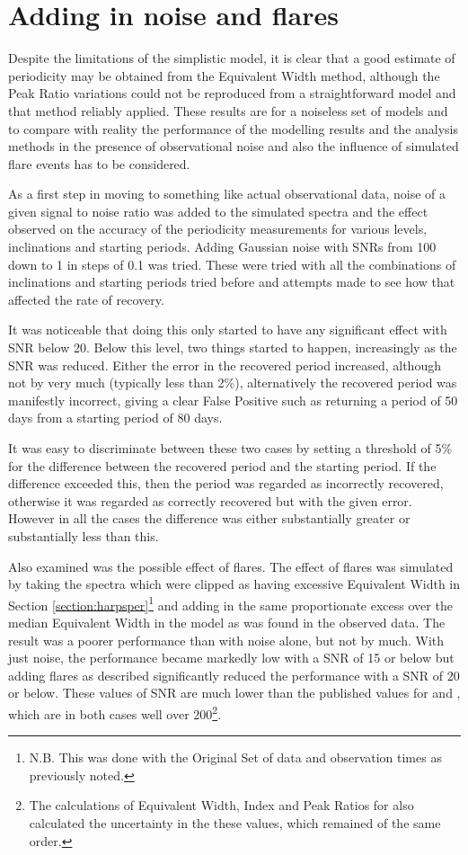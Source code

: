 \section{Adding in noise and flares}
\protect\label{section:addflares}

Despite the limitations of the simplistic model, it is clear that a good estimate of periodicity may be obtained from
the Equivalent Width method, although the Peak Ratio variations could not be reproduced from a straightforward model and that method reliably applied.
These results are for a noiseless set of models and to compare with reality the performance of the modelling results and
the analysis methods in the presence of observational noise and also the influence of simulated flare events has to be
considered.

As a first step in moving to something like actual observational data, noise of a given signal to noise ratio was added
to the simulated spectra and the effect observed on the accuracy of the periodicity measurements for various levels,
inclinations and starting periods. Adding Gaussian noise with SNRs from 100 down to 1 in steps of 0.1 was tried.
These were tried with all the combinations of inclinations and starting periods tried before and attempts made to see
how that affected the rate of recovery.

It was noticeable that doing this only started to have any significant effect with SNR below 20. Below this level, two
things started to happen, increasingly as the SNR was reduced. Either the error in the recovered period increased,
although not by very much (typically less than 2\%), alternatively the recovered period was manifestly incorrect, giving
a clear False Positive such as returning a period of 50 days from a starting period of 80 days.

It was easy to discriminate between these two cases by setting a threshold of 5\% for the difference between the
recovered period and the starting period. If the difference exceeded this, then the period was regarded as incorrectly
recovered, otherwise it was regarded as correctly recovered but with the given error. However in all the cases the
difference was either substantially greater or substantially less than this.

Also examined was the possible effect of flares. The effect of flares was simulated by taking the spectra
which were clipped as having excessive Equivalent Width in Section \ref{section:harpsper}\footnote{N.B. This was done
  with the Original Set of data and observation times as previously noted.} and adding in the same
proportionate excess over the median Equivalent Width in the model as was found in the observed data. The result was a
poorer performance than with noise alone, but not by much. With just noise, the performance became markedly low with a
SNR of 15 or below but adding flares as described significantly reduced the performance with a SNR of 20 or below. These
values of SNR are much lower than the published values for {\uves} and {\harps}, which are in both cases well over
200\footnote{The calculations of Equivalent Width, {\ha} Index and Peak Ratios for {\harps} also calculated the
  uncertainty in the these values, which remained of the same order.}.

